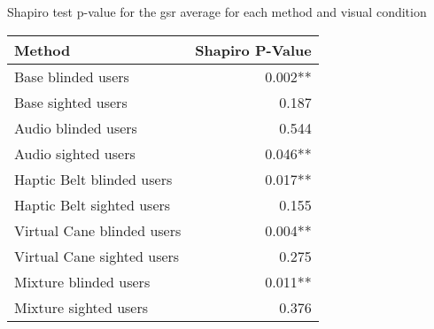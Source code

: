 
\centering
\caption{Shapiro test p-value for the gsr average for each method and visual condition}
\label{tab:shapiro_gsr_avg}
\begin{tabular}{lr}
\toprule
                    Method & Shapiro P-Value \\
\midrule
        Base blinded users &         0.002** \\
        Base sighted users &           0.187 \\
       Audio blinded users &           0.544 \\
       Audio sighted users &         0.046** \\
 Haptic Belt blinded users &         0.017** \\
 Haptic Belt sighted users &           0.155 \\
Virtual Cane blinded users &         0.004** \\
Virtual Cane sighted users &           0.275 \\
     Mixture blinded users &         0.011** \\
     Mixture sighted users &           0.376 \\
\bottomrule
\end{tabular}
